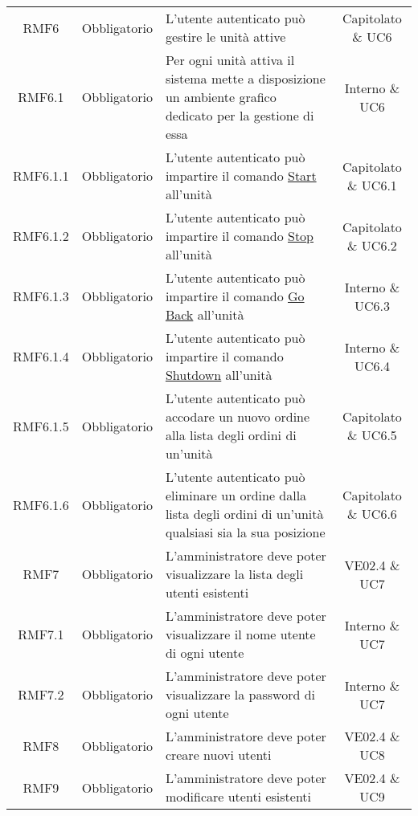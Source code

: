 \begin{longtable}[h!] { c c m{8cm} c}
		RMF6 & Obbligatorio & L'utente autenticato può gestire le unità attive & Capitolato \& UC6 \\

		RMF6.1 & Obbligatorio & Per ogni unità attiva il sistema mette a disposizione un ambiente grafico dedicato per la gestione di essa & Interno \& UC6 \\

		RMF6.1.1 & Obbligatorio & L'utente autenticato può impartire il comando \underline{Start} all'unità & Capitolato \& UC6.1 \\

		RMF6.1.2 & Obbligatorio & L'utente autenticato può impartire il comando \underline{Stop} all'unità & Capitolato \& UC6.2 \\

		RMF6.1.3 & Obbligatorio & L'utente autenticato può impartire il comando \underline{Go Back} all'unità & Interno \& UC6.3 \\

		RMF6.1.4 & Obbligatorio & L'utente autenticato può impartire il comando \underline{Shutdown} all'unità & Interno \& UC6.4 \\

		RMF6.1.5 & Obbligatorio & L'utente autenticato può accodare un nuovo ordine alla lista degli ordini di un'unità & Capitolato \& UC6.5 \\

		RMF6.1.6 & Obbligatorio & L'utente autenticato può eliminare un ordine dalla lista degli ordini di un'unità qualsiasi sia la sua posizione & Capitolato \& UC6.6 \\

		RMF7 & Obbligatorio & L'amministratore deve poter visualizzare la lista degli utenti esistenti & VE02.4 \& UC7 \\

		RMF7.1 & Obbligatorio & L'amministratore deve poter visualizzare il nome utente di ogni utente & Interno \& UC7 \\

		RMF7.2 & Obbligatorio & L'amministratore deve poter visualizzare la password di ogni utente & Interno \& UC7 \\

		RMF8 & Obbligatorio & L'amministratore deve poter creare nuovi utenti & VE02.4 \& UC8 \\

		RMF9 & Obbligatorio & L'amministratore deve poter modificare utenti esistenti & VE02.4 \& UC9 \\



\end{longtable}
